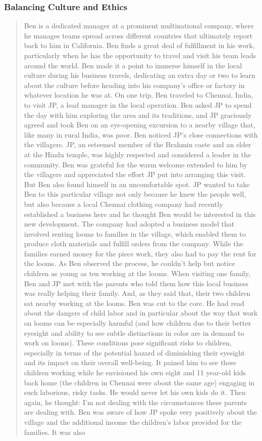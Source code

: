 \subsubsection{Balancing Culture and Ethics \cite{5_ben}}
\label{sec:ben}

\begin{quote}
  Ben is a dedicated manager at a prominent multinational company, where he manages teams spread across different countries that ultimately report back to him in California. Ben finds a great deal of fulfillment in his work, particularly when he has the opportunity to travel and visit his team leads around the world. Ben made it a point to immerse himself in the local culture during his business travels, dedicating an extra day or two to learn about the culture before heading into his company's office or factory in whatever location he was at. On one trip, Ben traveled to Chennai, India, to visit JP, a lead manager in the local operation. Ben asked JP to spend the day with him exploring the area and its traditions, and JP graciously agreed and took Ben on an eye-opening excursion to a nearby village that, like many in rural India, was poor. Ben noticed JP's close connections with the villagers. JP, an esteemed member of the Brahmin caste and an elder at the Hindu temple, was highly respected and considered a leader in the community. Ben was grateful for the warm welcome extended to him by the villagers and appreciated the effort JP put into arranging this visit. But Ben also found himself in an uncomfortable spot. JP wanted to take Ben to this particular village not only because he knew the people well, but also because a local Chennai clothing company had recently established a business here and he thought Ben would be interested in this new development. The company had adopted a business model that involved renting looms to families in the village, which enabled them to produce cloth materials and fulfill orders from the company. While the families earned money for the piece work, they also had to pay the rent for the looms. As Ben observed the process, he couldn't help but notice children as young as ten working at the looms. When visiting one family, Ben and JP met with the parents who told them how this local business was really helping their family. And, as they said that, their two children sat nearby working at the looms. Ben was cut to the core. He had read about the dangers of child labor and in particular about the way that work on looms can be especially harmful (and how children due to their better eyesight and ability to see subtle distinctions in color are in demand to work on looms). These conditions pose significant risks to children, especially in terms of the potential hazard of diminishing their eyesight and its impact on their overall well-being. It pained him to see these children working while he envisioned his own eight and 11 year-old kids back home (the children in Chennai were about the same age) engaging in such laborious, risky tasks. He would never let his own kids do it. Then again, he thought: I'm not dealing with the circumstances these parents are dealing with. Ben was aware of how JP spoke very positively about the village and the additional income the children's labor provided for the families. It was also 
\end{quote}
